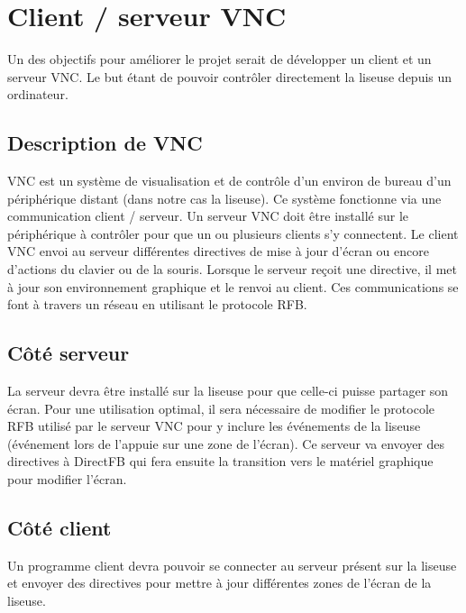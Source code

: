 \section{Client / serveur VNC}

Un des objectifs pour améliorer le projet serait de développer un client et un serveur VNC. Le but étant de pouvoir contrôler directement la liseuse depuis un ordinateur.

\subsection{Description de VNC}

VNC est un système de visualisation et de contrôle d'un environ de bureau d'un périphérique distant (dans notre cas la liseuse). Ce système fonctionne via une communication client / serveur. Un serveur VNC doit être installé sur le périphérique à contrôler pour que un ou plusieurs clients s'y connectent. Le client VNC envoi au serveur différentes directives de mise à jour d'écran ou encore d'actions du clavier ou de la souris. Lorsque le serveur reçoit une directive, il met à jour son environnement graphique et le renvoi au client. Ces communications se font à travers un réseau en utilisant le protocole RFB.

\subsection{Côté serveur}

La serveur devra être installé sur la liseuse pour que celle-ci puisse partager son écran. Pour une utilisation optimal, il sera nécessaire de modifier le protocole RFB utilisé par le serveur VNC pour y inclure les événements de la liseuse (événement lors de l'appuie sur une zone de l'écran). Ce serveur va envoyer des directives à DirectFB qui fera ensuite la transition vers le matériel graphique pour modifier l'écran.

\subsection{Côté client}

Un programme client devra pouvoir se connecter au serveur présent sur la liseuse et envoyer des directives pour mettre à jour différentes zones de l'écran de la liseuse.

